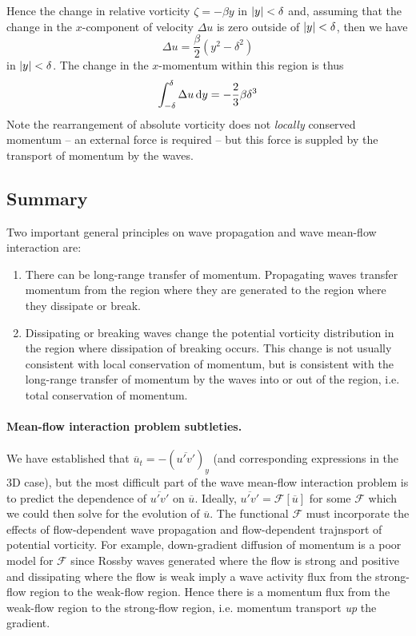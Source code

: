 \documentclass{jknotes}
\begin{document}
Hence the change in relative vorticity $\zeta = -\beta y$ in $\abs{y} <
\delta$ and, assuming that the change in the $x$-component of velocity $\Delta
u$ is zero outside of $\abs{y} < \delta$, then we have
\begin{equation}
	\Delta u = \frac{\beta}{2}(y^2-\delta^2)
\end{equation}
in $\abs{y} < \delta$. The change in the $x$-momentum within this region is
thus
\begin{equation}
	\int_{-\delta}^\delta \Delta u \, \diffd y = -\frac{2}{3}\beta \delta^3
\end{equation}
Note the rearrangement of absolute vorticity does not \emph{locally} conserved
momentum -- an external force is required -- but this force is suppled by the
transport of momentum by the waves.

\subsection{Summary}
Two important general principles on wave propagation and wave mean-flow
interaction are:
\begin{enumerate}
	\item There can be long-range transfer of momentum. Propagating waves
		transfer momentum from the region where they are generated to the
		region where they dissipate or break.
	\item Dissipating or breaking waves change the potential vorticity
		distribution in the region where dissipation of breaking occurs. This
		change is not usually consistent with local conservation of momentum,
		but is consistent with the long-range transfer of momentum by the
		waves into or out of the region, i.e. total conservation of momentum.
\end{enumerate}

\paragraph{Mean-flow interaction problem subtleties.}
We have established that $\overline{u}_t = -(\overline{u'v'})_y$ (and
corresponding expressions in the 3D case), but the most difficult part of the
wave mean-flow interaction problem is to predict the dependence of
$\overline{u'v'}$ on $\overline{u}$. Ideally, $\overline{u'v'} =
\mathcal{F}\!\left[\overline{u}\right]$ for some $\mathcal{F}$ which we could
then solve for the evolution of $\overline{u}$. The functional $\mathcal{F}$
must incorporate the effects of flow-dependent wave propagation and
flow-dependent trajnsport of potential vorticity. For example, down-gradient
diffusion of momentum is a poor model for $\mathcal{F}$ since Rossby waves
generated where the flow is strong and positive and dissipating where the flow
is weak imply a wave activity flux from the strong-flow region to the
weak-flow region. Hence there is a momentum flux from the weak-flow region to
the strong-flow region, i.e. momentum transport \emph{up} the gradient. 
\end{document}
